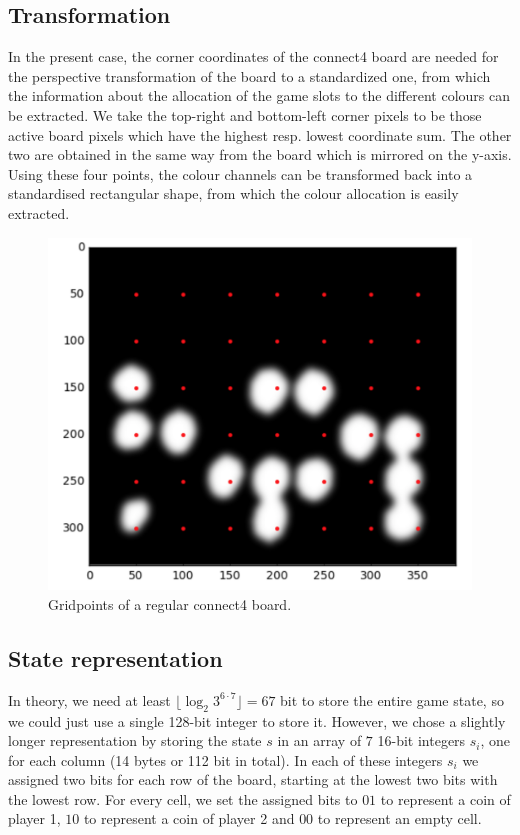 \documentclass[10pt,twocolumn,letterpaper]{article}
\begin{document}
\subsection{Transformation}
In the present case, the corner coordinates of the connect4 board are needed for the perspective transformation of the board to a standardized one, from which the information about the allocation of the game slots to the different colours can be extracted.
We take the top-right and bottom-left corner pixels to be those active board pixels which have the highest resp. lowest coordinate sum. The other two are obtained in the same way from the board which is mirrored on the y-axis.
Using these four points, the colour channels can be transformed back into a standardised rectangular shape, from which the colour allocation is easily extracted.
\begin{figure}[bh]
  \centering
  \includegraphics[width = .3\textwidth]{figures/grid.png}
  \caption{Gridpoints of a regular connect4 board.}
  \label{fig:grid}
\end{figure}




\subsection{State representation}
In theory, we need at least $\lfloor \log_2 3^{6\cdot 7} \rfloor = 67$ bit to store the entire game state, so we could just use a single 128-bit integer to store it.
However, we chose a slightly longer representation by storing the state $s$ in an array of $7$ 16-bit integers $s_i$, one for each column (14 bytes or 112 bit in total).
In each of these integers $s_i$ we assigned two bits for each row of the board, starting at the lowest two bits with the lowest row.
For every cell, we set the assigned bits to $01$ to represent a coin of player 1, $10$ to represent a coin of player 2 and $00$ to represent an empty cell.
\end{document}
